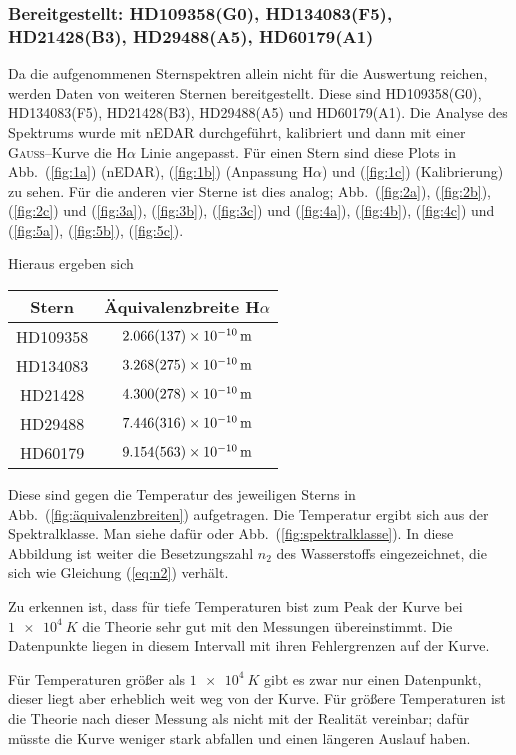 \subsubsection{Bereitgestellt: HD109358(G0), HD134083(F5), HD21428(B3), HD29488(A5), HD60179(A1)}
Da die aufgenommenen Sternspektren allein nicht für die Auswertung reichen, werden Daten von weiteren Sternen bereitgestellt.
Diese sind HD109358(G0), HD134083(F5), HD21428(B3), HD29488(A5) und HD60179(A1).
Die Analyse des Spektrums wurde mit nEDAR durchgeführt, kalibriert und dann mit einer \textsc{Gauss}--Kurve die H$\alpha $ Linie angepasst.
Für einen Stern sind diese Plots in Abb.\ (\ref{fig:1a}) (nEDAR), (\ref{fig:1b}) (Anpassung H$\alpha $) und (\ref{fig:1c}) (Kalibrierung) zu sehen.
Für die anderen vier Sterne ist dies analog; Abb.\ (\ref{fig:2a}), (\ref{fig:2b}), (\ref{fig:2c}) und (\ref{fig:3a}), (\ref{fig:3b}), (\ref{fig:3c}) und (\ref{fig:4a}), (\ref{fig:4b}), (\ref{fig:4c}) und (\ref{fig:5a}), (\ref{fig:5b}), (\ref{fig:5c}).

Hieraus ergeben sich
\begin{table}[h]
  \begin{tabular}{cc}
    \toprule
    Stern & Äquivalenzbreite H$\alpha $\\
    \midrule
    HD109358 & $\SI{2.066+-0.137e-10}{m}$ \\
    HD134083 & $\SI{3.268+-0.275e-10}{m}$ \\
    HD21428 & $\SI{4.300+-0.278e-10}{m}$ \\
    HD29488 & $\SI{7.446+-0.316e-10}{m}$ \\
    HD60179 & $\SI{9.154+-0.563e-10}{m}$ \\
    \bottomrule
  \end{tabular}
\end{table}
Diese sind gegen die Temperatur des jeweiligen Sterns in Abb.\ (\ref{fig:äquivalenzbreiten}) aufgetragen.
Die Temperatur ergibt sich aus der Spektralklasse.
Man siehe dafür \cite{anleitung464} oder Abb.\ (\ref{fig:spektralklasse}).
In diese Abbildung ist weiter die Besetzungszahl $n_2$ des Wasserstoffs eingezeichnet, die sich wie Gleichung (\ref{eq:n2}) verhält.

Zu erkennen ist, dass für tiefe Temperaturen bist zum Peak der Kurve bei $\SI{1e+4}{K}$ die Theorie sehr gut mit den Messungen übereinstimmt.
Die Datenpunkte liegen in diesem Intervall mit ihren Fehlergrenzen auf der Kurve.

Für Temperaturen größer als $\SI{1e+4}{K}$ gibt es zwar nur einen Datenpunkt, dieser liegt aber erheblich weit weg von der Kurve.
Für größere Temperaturen ist die Theorie nach dieser Messung als nicht mit der Realität vereinbar; dafür müsste die Kurve weniger stark abfallen und einen längeren Auslauf haben.
